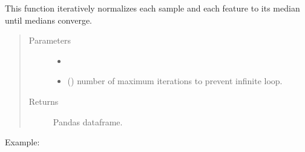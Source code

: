 \documentclass[letterpaper,10pt,english]{sphinxmanual}
\begin{document}
\begin{fulllineitems}
\label{\detokenize{_autosummary/analytics_core.analytics:analytics_core.analytics.analytics.median_polish_normalization}}
This function iteratively normalizes each sample and each feature to its 
median until medians converge.
\begin{quote}\begin{description}
\item[{Parameters}] \leavevmode\begin{itemize}
\item {} 
 \textendash{} 

\item {} 
 () \textendash{} number of maximum iterations to prevent infinite loop.

\end{itemize}

\item[{Returns}] \leavevmode
Pandas dataframe.

\end{description}\end{quote}

Example:

\begin{sphinxVerbatim}[commandchars=\\\{\}]
     
\end{sphinxVerbatim}

\end{fulllineitems}

\end{document}
